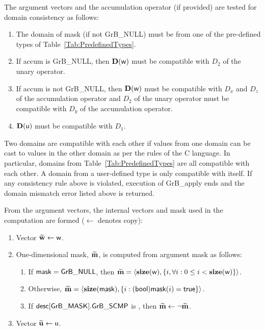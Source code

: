 The argument vectors and the accumulation 
operator (if provided) are tested for domain consistency as follows:
\begin{enumerate}
	\item The domain of {\sf mask} (if not {\sf GrB\_NULL}) must be from one of 
    the pre-defined types of Table~\ref{Tab:PredefinedTypes}.

	\item If {\sf accum} is {\sf GrB\_NULL}, then $\bold{D}({\sf w})$ must be 
    compatible with $D_2$ of the unary operator.

	\item If {\sf accum} is not {\sf GrB\_NULL}, then $\bold{D}({\sf w})$ must be
    compatible with $D_x$ and $D_z$ of the accumulation operator and 
    $D_2$ of the unary operator must be compatible with $D_y$ of the accumulation operator.

	\item $\bold{D}({\sf u})$ must be compatible with $D_1$.
\end{enumerate}
Two domains are compatible with each other if values from one domain can be cast 
to values in the other domain as per the rules of the C language.
In particular, domains from Table~\ref{Tab:PredefinedTypes} are all compatible 
with each other. A domain from a user-defined type is only compatible with itself.
If any consistency rule above is violated, execution of {\sf GrB\_apply} ends
and the domain mismatch error listed above is returned.

From the argument vectors, the internal vectors and mask used in 
the computation are formed ($\leftarrow$ denotes copy):
\begin{enumerate}
	\item Vector ${\bf \widetilde{w}} \leftarrow {\sf w}$.

	\item One-dimensional mask, ${\bf \widetilde{m}}$, is computed from 
    argument {\sf mask} as follows:
	\begin{enumerate}
		\item	If ${\sf mask} = {\sf GrB\_NULL}$, then ${\bf \widetilde{m}} = 
        \langle \bold{size}({\sf w}), \{i, \forall i : 0 \leq i < 
        \bold{size}({\sf w}) \} \rangle$.

		\item	Otherwise, ${\bf \widetilde{m}} = 
        \langle \bold{size}({\sf mask}), \{i : ({\sf bool}){\sf mask}(i) = 
        {\sf true}\} \rangle$.

		\item	If ${\sf desc[GrB\_MASK].GrB\_SCMP}$ is \true, then 
        ${\bf \widetilde{m}} \leftarrow \neg {\bf \widetilde{m}}$.
	\end{enumerate}

	\item Vector ${\bf \widetilde{u}} \leftarrow {\sf u}$.
    
\end{enumerate}

